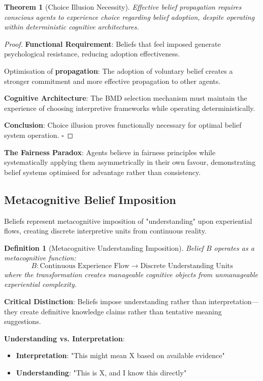 \documentclass[12pt,a4paper]{article}
\newtheorem{theorem}{Theorem}
\newtheorem{definition}{Definition}
\begin{document}
\begin{theorem}[Choice Illusion Necessity]
Effective belief propagation requires conscious agents to experience choice regarding belief adoption, despite operating within deterministic cognitive architectures.
\end{theorem}

\begin{proof}
\textbf{Functional Requirement}: Beliefs that feel imposed generate psychological resistance, reducing adoption effectiveness.

Optimisation of \textbf{propagation}: The adoption of voluntary belief creates a stronger commitment and more effective propagation to other agents.

\textbf{Cognitive Architecture}: The BMD selection mechanism must maintain the experience of choosing interpretive frameworks while operating deterministically.

\textbf{Conclusion}: Choice illusion proves functionally necessary for optimal belief system operation. $\square$
\end{proof}

\textbf{The Fairness Paradox}: Agents believe in fairness principles while systematically applying them asymmetrically in their own favour, demonstrating belief systems optimised for advantage rather than consistency.

\subsection{Metacognitive Belief Imposition}

Beliefs represent metacognitive imposition of "understanding" upon experiential flows, creating discrete interpretive units from continuous reality.

\begin{definition}[Metacognitive Understanding Imposition]
Belief $B$ operates as a metacognitive function:
$$B: \text{Continuous Experience Flow} \rightarrow \text{Discrete Understanding Units}$$
where the transformation creates manageable cognitive objects from unmanageable experiential complexity.
\end{definition}

\textbf{Critical Distinction}: Beliefs impose understanding rather than interpretation—they create definitive knowledge claims rather than tentative meaning suggestions.

\textbf{Understanding vs. Interpretation}:
\begin{itemize}
\item \textbf{Interpretation}: "This might mean X based on available evidence"
\item \textbf{Understanding}: "This is X, and I know this directly"
\end{itemize}
\end{document}
